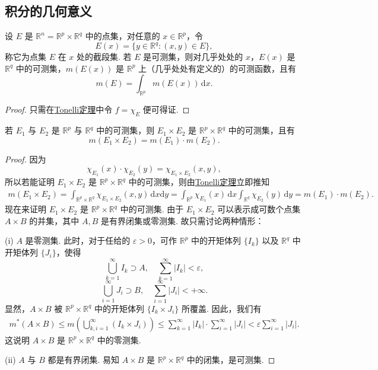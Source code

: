 \documentclass[../../main.tex]{subfiles}
\begin{document}
\subsection{积分的几何意义}

\begin{theorem}
设 \( E \) 是 \( \mathbb{R}^n = \mathbb{R}^p \times \mathbb{R}^q \) 中的点集，对任意的 \( x \in \mathbb{R}^p \)，令
\[
E(x) = \{ y \in \mathbb{R}^q : (x, y) \in E \},
\]
称它为点集 \( E \) 在 \( x \) 处的截段集. 若 \( E \) 是可测集，则对几乎处处的 \( x \)，\( E(x) \) 是 \( \mathbb{R}^q \) 中的可测集，\( m(E(x)) \) 是 \( \mathbb{R}^p \) 上（几乎处处有定义的）的可测函数，且有
\[
m(E) = \int_{\mathbb{R}^p} m(E(x)) \, \mathrm{d}x.
\]
\end{theorem}
\begin{proof}
只需在\hyperref[theorem:Tonelli 定理 非负可测函数的情形]{Tonelli定理}中令 \( f = \chi_E \) 便可得证.
\end{proof}

\begin{theorem}
若 \( E_1 \) 与 \( E_2 \) 是 \( \mathbb{R}^p \) 与 \( \mathbb{R}^q \) 中的可测集，则 \( E_1 \times E_2 \) 是 \( \mathbb{R}^p \times \mathbb{R}^q \) 中的可测集，且有
\[
m(E_1 \times E_2) = m(E_1) \cdot m(E_2).
\]
\end{theorem}
\begin{proof}
因为
\[
\chi_{E_1}(x) \cdot \chi_{E_2}(y) = \chi_{E_1 \times E_2}(x, y),
\]
所以若能证明 \( E_1 \times E_2 \) 是 \( \mathbb{R}^p \times \mathbb{R}^q \) 中的可测集，则由\hyperref[theorem:Tonelli 定理 非负可测函数的情形]{Tonelli定理}立即推知
\begin{align*}
m(E_1 \times E_2) = \int_{\mathbb{R}^p \times \mathbb{R}^q} \chi_{E_1 \times E_2}(x, y) \, \mathrm{d}x\mathrm{d}y 
= \int_{\mathbb{R}^p} \chi_{E_1}(x) \, \mathrm{d}x \int_{\mathbb{R}^q} \chi_{E_2}(y) \, \mathrm{d}y = m(E_1) \cdot m(E_2).
\end{align*}
现在来证明 \( E_1 \times E_2 \) 是 \( \mathbb{R}^p \times \mathbb{R}^q \) 中的可测集. 由于 \( E_1 \times E_2 \) 可以表示成可数个点集 \( A \times B \) 的并集，其中 \( A, B \) 是有界闭集或零测集. 故只需讨论两种情形：

(i) \( A \) 是零测集. 此时，对于任给的 \( \varepsilon > 0 \)，可作 \( \mathbb{R}^p \) 中的开矩体列 \( \{ I_k \} \) 以及 \( \mathbb{R}^q \) 中开矩体列 \( \{ J_i \} \)，使得
\[
\bigcup_{k = 1}^{\infty} I_k \supset A, \quad \sum_{k = 1}^{\infty} |I_k| < \varepsilon,
\]
\[
\bigcup_{i = 1}^{\infty} J_i \supset B, \quad \sum_{i = 1}^{\infty} |J_i| < +\infty.
\]
显然，\( A \times B \) 被 \( \mathbb{R}^p \times \mathbb{R}^q \) 中的开矩体列 \( \{ I_k \times J_i \} \) 所覆盖. 因此，我们有
\begin{align*}
m^*(A \times B) \leqslant m\left( \bigcup_{k, i = 1}^{\infty} (I_k \times J_i) \right) 
\leqslant \sum_{k = 1}^{\infty} |I_k| \cdot \sum_{i = 1}^{\infty} |J_i| < \varepsilon \sum_{i = 1}^{\infty} |J_i|.
\end{align*}
这说明 \( A \times B \) 是 \( \mathbb{R}^p \times \mathbb{R}^q \) 中的零测集.

(ii) \( A \) 与 \( B \) 都是有界闭集. 易知 \( A \times B \) 是 \( \mathbb{R}^p \times \mathbb{R}^q \) 中的闭集，是可测集.
\end{proof}
\end{document}
